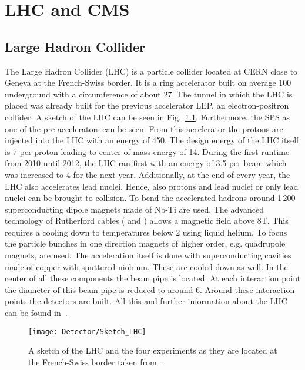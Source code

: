 \chapter{LHC and CMS \label{sec:LHCCMS}}

\section{Large Hadron Collider \label{LHCCMSLHC}}

The Large Hadron Collider (LHC) is a particle collider located at CERN close to Geneva at the French-Swiss border. It is a ring accelerator built on average 100\m{} underground with a circumference of about 27\km{}. The tunnel in which the LHC is placed was already built for the previous accelerator LEP, an electron-positron collider. A sketch of the LHC can be seen in Fig.~\ref{plot:LCHSketch}. Furthermore, the SPS as one of the pre-accelerators can be seen. From this accelerator the protons are injected into the LHC with an energy of 450\GeV{}. The design energy of the LHC itself is 7\TeV{} per proton leading to center-of-mass energy of 14\TeV{}. During the first runtime from 2010 until 2012, the LHC ran first with an energy of 3.5\TeV{} per beam which was increased to 4\TeV{} for the next year. Additionally, at the end of every year, the LHC also accelerates lead nuclei. Hence, also protons and lead nuclei or only lead nuclei can be brought to collision. To bend the accelerated hadrons around 1\,200 superconducting dipole magnets made of Nb-Ti are used. The advanced technology of Rutherford cables (\cite{RuthCables1} and \cite{RuthCables2}) allows a magnetic field above 8\unit{T}. This requires a cooling down to temperatures below 2\K{} using liquid helium. To focus the particle bunches in one direction magnets of higher order, e.g. quadrupole magnets, are used. The acceleration itself is done with superconducting cavities made of copper with sputtered niobium. These are cooled down as well. In the center of all these components the beam pipe is located. At each interaction point the diameter of this beam pipe is reduced to around 6\cm{}. Around these interaction points the detectors are built. All this and further information about the LHC can be found in~.

\begin{figure}[!ht]
  \centering
  \texttt{[image: Detector/Sketch\_LHC]}
  \caption[Sketch of the LHC]{A sketch of the LHC and the four experiments as they are located at the French-Swiss border taken from~\cite{Team:40525}. \label{plot:LCHSketch}}
\end{figure}

